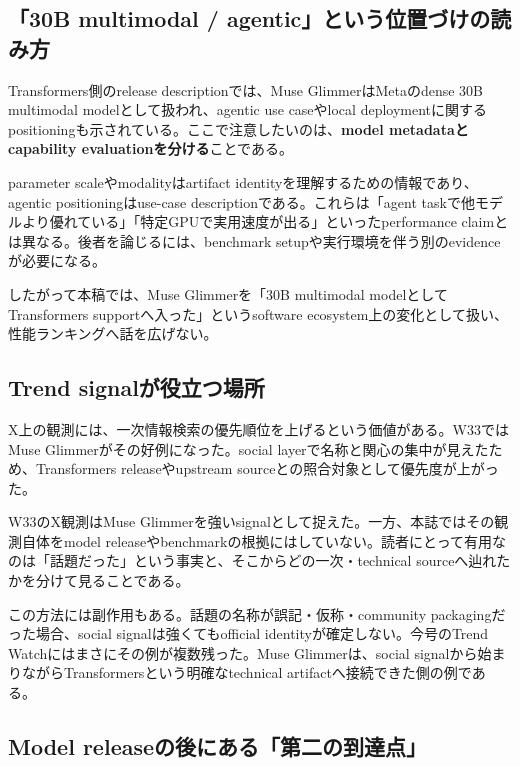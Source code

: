 \subsection*{「30B multimodal / agentic」という位置づけの読み方}

Transformers側のrelease descriptionでは、Muse GlimmerはMetaのdense 30B multimodal modelとして扱われ、agentic use caseやlocal deploymentに関するpositioningも示されている\cite{hf-transformers-515}。ここで注意したいのは、\textbf{model metadataとcapability evaluationを分ける}ことである。

parameter scaleやmodalityはartifact identityを理解するための情報であり、agentic positioningはuse-case descriptionである。これらは「agent taskで他モデルより優れている」「特定GPUで実用速度が出る」といったperformance claimとは異なる。後者を論じるには、benchmark setupや実行環境を伴う別のevidenceが必要になる。

したがって本稿では、Muse Glimmerを「30B multimodal modelとしてTransformers supportへ入った」というsoftware ecosystem上の変化として扱い、性能ランキングへ話を広げない。

\subsection*{Trend signalが役立つ場所}

X上の観測には、一次情報検索の優先順位を上げるという価値がある。W33ではMuse Glimmerがその好例になった。social layerで名称と関心の集中が見えたため、Transformers releaseやupstream sourceとの照合対象として優先度が上がった\cite{w33-grok-r3-observation,w33-grok-r3-review}。

\begin{communitynote}
W33のX観測はMuse Glimmerを強いsignalとして捉えた。一方、本誌ではその観測自体をmodel releaseやbenchmarkの根拠にはしていない。読者にとって有用なのは「話題だった」という事実と、そこからどの一次・technical sourceへ辿れたかを分けて見ることである\cite{w33-grok-r3-review}。
\end{communitynote}

この方法には副作用もある。話題の名称が誤記・仮称・community packagingだった場合、social signalは強くてもofficial identityが確定しない。今号のTrend Watchにはまさにその例が複数残った。Muse Glimmerは、social signalから始まりながらTransformersという明確なtechnical artifactへ接続できた側の例である。

\subsection*{Model releaseの後にある「第二の到達点」}

